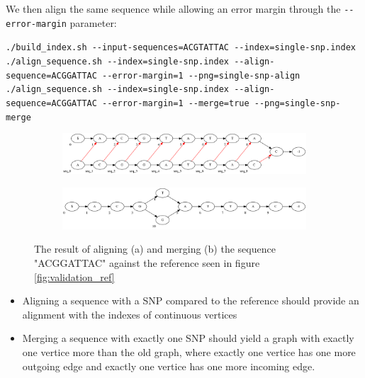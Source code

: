 \documentclass[thesis.tex]{subfiles}
\begin{document}
We then align the same sequence while allowing an error margin through the \texttt{-{}-error-margin} parameter:\\
\par\noindent
\texttt{./build\_index.sh -{}-input-sequences=ACGTATTAC -{}-index=single-snp.index}\\
\texttt{./align\_sequence.sh -{}-index=single-snp.index -{}-align-sequence=ACGGATTAC -{}-error-margin=1 -{}-png=single-snp-align}\\
\texttt{./align\_sequence.sh -{}-index=single-snp.index -{}-align-sequence=ACGGATTAC -{}-error-margin=1 -{}-merge=true -{}-png=single-snp-merge}\\
\begin{figure}[!h]
  \begin{subfigure}[t]{\textwidth}
    \begin{mdframed}
      \includegraphics[width=\textwidth]{output/single-snp-align.png}
    \end{mdframed}
    \subcaption{}
  \end{subfigure}
  \begin{subfigure}[t]{\textwidth}
    \begin{mdframed}
      \includegraphics[width=\textwidth]{output/single-snp-merge.png}
    \end{mdframed}
    \subcaption{}
  \end{subfigure} 
  \caption{The result of aligning (a) and merging (b) the sequence "ACGGATTAC" against the reference seen in figure \ref{fig:validation_ref}}
  \label{fig:validation_single_snp}
\end{figure}
\begin{itemize}
\item Aligning a sequence with a SNP compared to the reference should provide an alignment with the indexes of continuous vertices
\item Merging a sequence with exactly one SNP should yield a graph with exactly one vertice more than the old graph, where exactly one vertice has one more outgoing edge and exactly one vertice has one more incoming edge.
\end{itemize}
\end{document}
